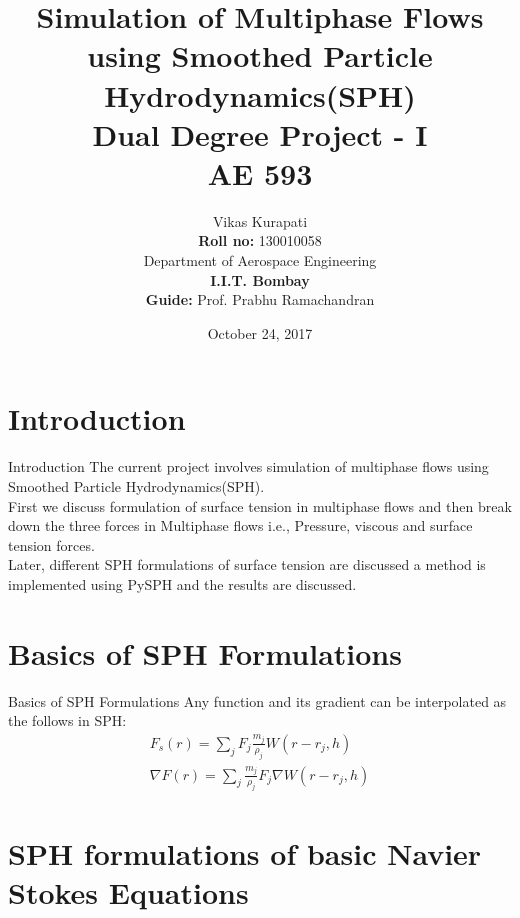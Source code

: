 \documentclass{beamer}
\title[Multiphase SPH]{\textbf{Simulation of Multiphase Flows using Smoothed Particle Hydrodynamics(SPH)}\\[0.1in]
		Dual Degree Project - I\\
		\textbf{AE 593}}
\author[Vikas K]{Vikas Kurapati \\ 
		\textbf{Roll no:} 130010058 \\
		Department of Aerospace Engineering\\
		\textbf{I.I.T. Bombay}\\[0.1in]
		\textbf{Guide:} Prof. Prabhu Ramachandran}
\date{October 24, 2017}
\begin{document}
\begin{frame}
\maketitle
\end{frame}

\section{Introduction}

\begin{frame}{Introduction}
\justifying
The current project involves simulation of multiphase flows using Smoothed Particle Hydrodynamics(SPH).\\[0.2in] 
First we discuss formulation of surface tension in multiphase flows and then break down the three forces in Multiphase flows i.e., Pressure, viscous and surface tension forces.\\[0.2in] 
Later, different SPH formulations of surface tension are discussed a method is implemented using PySPH and the results are discussed.
\end{frame}

\section{Basics of SPH Formulations}
\begin{frame}{Basics of SPH Formulations}
\justifying
Any function and its gradient can be interpolated as the follows in SPH:
\begin{eqnarray*}
F_s (r) = \sum_{j} F_j \frac{m_j}{\rho_j} W(r-r_j, h) \\
\nabla F(r) = \sum_j \frac{m_j}{\rho_j}F_j \nabla W(r-r_j, h)
\end{eqnarray*}
\end{frame}
\section{SPH formulations of basic Navier Stokes Equations}
\end{document}
